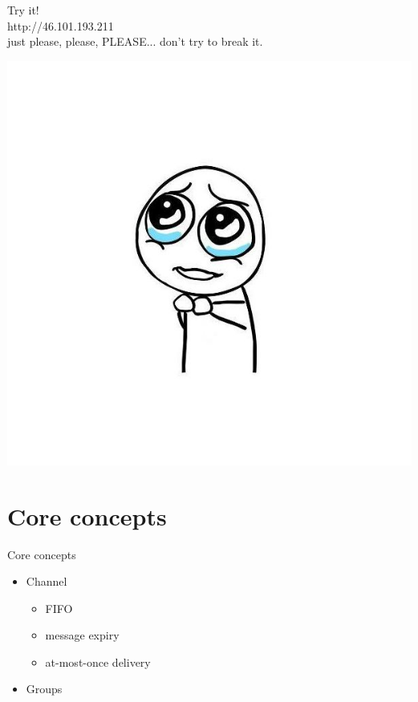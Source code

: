 \documentclass{beamer}
\begin{document}
\begin{frame}
	\begin{center}
	Try it!\\
	\huge
	http://46.101.193.211\\
	\normalsize
	\vspace{1em}
	\scriptsize
	just please, please, PLEASE... don't try to break it.\\
	\end{center}
	
	\begin{flushright}
			\includegraphics[scale=0.15]{please.jpg}	
	\end{flushright}
\end{frame}

\section{Core concepts}

\begin{frame}{Core concepts}
	\begin{adjustwidth}{2em}{2.5em}
	\begin{itemize}
		\item Channel
			\begin{itemize}
				\item FIFO
				\item message expiry
				\item at-most-once delivery
			\end{itemize}
		\item Groups
	\end{itemize}
	\end{adjustwidth}
\end{frame}
\end{document}
